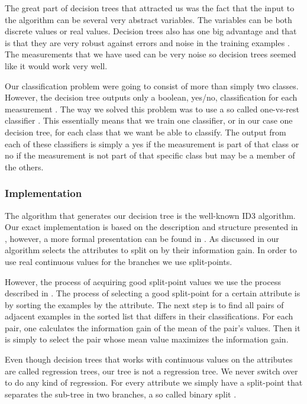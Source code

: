 \documentclass[a4paper, 10pt, conference]{ieeeconf}      %
\begin{document}
The great part of decision trees that attracted us was the fact that the input to the algorithm can be several very abstract variables. The variables can be both discrete values or real values. Decision trees also has one big advantage and that is that they are very robust against errors and noise in the training examples \cite{ml3}. The measurements that we have used can be very noise so decision trees seemed like it would work very well.

Our classification problem were going to consist of more than simply two classes. However, the decision tree outputs only a boolean, yes/no, classification for each measurement \cite{ml3}. The way we solved this problem was to use a so called one-vs-rest classifier \cite{praml}. This essentially means that we train one classifier, or in our case one decision tree, for each class that we want be able to classify. The output from each of these classifiers is simply a yes if the measurement is part of that class or no if the measurement is not part of that specific class but may be a member of the others.

\subsubsection{Implementation}
The algorithm that generates our decision tree is the well-known ID3 algorithm. Our exact implementation is based on the description and structure presented in \cite{aima}, however, a more formal presentation can be found in \cite{ml3}. As discussed in \cite{aima} our algorithm selects the attributes to split on by their information gain. In order to use real continuous values for the branches we use split-points.

However, the process of acquiring good split-point values we use the process described in \cite{ml3}. The process of selecting a good split-point for a certain attribute is by sorting the examples by the attribute. The next step is to find all pairs of adjacent examples in the sorted list that differs in their classifications. For each pair, one calculates the information gain of the mean of the pair's values. Then it is simply to select the pair whose mean value maximizes the information gain.

Even though decision trees that works with continuous values on the attributes are called regression trees, our tree is not a regression tree. We never switch over to do any kind of regression. For every attribute we simply have a split-point that separates the sub-tree in two branches, a so called binary split \cite{aima}.
\end{document}
